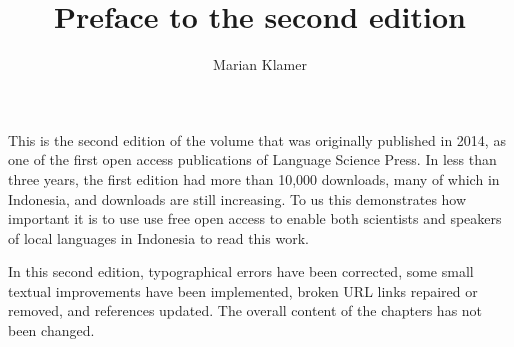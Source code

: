 \documentclass[output=paper]{LSP/langsci}
\title{Preface to the second edition}
\author{Marian Klamer}
\makeatletter
\renewcommand{\lsCollectionPaperTitle}{{%
  \renewcommand{\newlineTOC}{}
  \renewcommand{\newlineCover}{\\} 
  \\[-1\baselineskip]
  \noindent{\LARGE ~}\\
  \bigskip  
  \noindent\@title}}
\renewcommand{\lsCollectionPaperTOC}{{%
  \iflsCollectionChapter%
    \protect\numberline{~}\fi
  \@title\newline{\normalfont\@author}}}
\makeatother
\begin{document}

\noindent
This is the second edition of the volume that was originally published in 2014, as one of the first open access publications of Language Science Press. In less than three years, the first edition had more than 10,000 downloads, many of which in Indonesia, and downloads are still increasing. To us this demonstrates how important it is to use use free open access to enable both scientists and speakers of local languages in Indonesia to read this work. 

In this second edition, typographical errors have been corrected, some small textual improvements have been implemented, broken URL links repaired or removed, and references updated. The overall content of the chapters has not been changed.


\renewcommand{\lsCollectionPaperTitle}{{%
  \renewcommand{\newlineTOC}{}
  \renewcommand{\newlineCover}{\\} 
  \\[-1\baselineskip]
  \noindent{\LARGE Chapter \thechapter}\\
  \bigskip  
  \@title}}
  
  \renewcommand{\lsCollectionPaperTOC}{{%
  \iflsCollectionChapter%
    \protect\numberline{\thechapter}\fi
  \@title\newline{\normalfont\@author}}}

  
\end{document}
